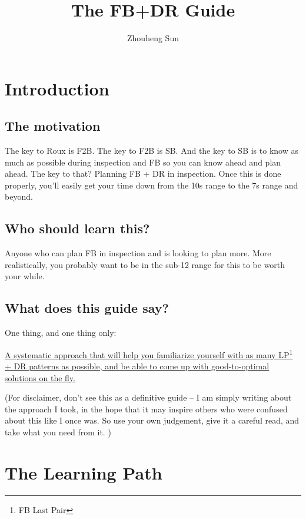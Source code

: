 \documentclass[12pt,letter]{article}
\title{The FB+DR Guide}
\author{Zhouheng Sun}
\date{}
\begin{document}
\maketitle

\section{Introduction}

\subsection*{The motivation}

The key to Roux is F2B. The key to F2B is SB. And the key to SB is to know as much as possible during inspection and FB so you can know ahead and plan ahead. The key to that? Planning FB + DR in inspection. Once this is done properly, you’ll easily get your time down from the 10s range to the 7s range and beyond. 

\subsection*{Who should learn this?}

Anyone who can plan FB in inspection and is looking to plan more. More realistically, you probably want to be in the sub-12 range for this to be worth your while.



\subsection*{What does this guide say?}

One thing, and one thing only: 

\ul{A systematic approach that will help you familiarize yourself with as many LP\footnote{FB Last Pair} + DR patterns as possible, and be able to come up with good-to-optimal solutions on the fly.}

\vspace{12px}

(For disclaimer, don't see this as a definitive guide -- I am simply writing about the approach I took, in the hope that it may inspire others who were confused about this like I once was. So use your own judgement, give it a careful read, and take what you need from it. )

\section{The Learning Path}
\end{document}

